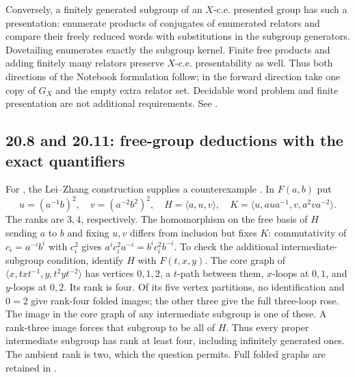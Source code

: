 Conversely, a finitely generated subgroup of an \(X\)-c.e.
presented group has such a presentation: enumerate products
of conjugates of enumerated relators and compare their
freely reduced words with substitutions in the subgroup
generators. Dovetailing enumerates exactly the subgroup
kernel. Finite free products and adding finitely many
relators preserve \(X\)-c.e. presentability as well.
Thus both directions of the Notebook formulation follow;
in the forward direction take one copy of \(G_X\) and
the empty extra relator set. Decidable word problem and
finite presentation are not additional requirements.
See .

\subsection{20.8 and 20.11: free-group deductions with the exact quantifiers}

\label{prior:20.8}
For , the Lei--Zhang construction supplies a
counterexample \cite{lei-zhang}. In \(F(a,b)\) put
\[
 u=(a^{-1}b)^2,\quad v=(a^{-2}b^2)^2,\quad
 H=\langle a,u,v\rangle,\quad
 K=\langle u,aua^{-1},v,a^2va^{-2}\rangle.
\]
The ranks are \(3,4\), respectively. The homomorphism
on the free basis of \(H\) sending \(a\) to \(b\) and
fixing \(u,v\) differs from inclusion but fixes \(K\):
commutativity of \(c_i=a^{-i}b^i\) with \(c_i^2\) gives
\(a^ic_i^2a^{-i}=b^ic_i^2b^{-i}\).
To check the additional intermediate-subgroup condition,
identify \(H\) with \(F(t,x,y)\). The core graph of
\(\langle x,txt^{-1},y,t^2yt^{-2}\rangle\) has vertices
\(0,1,2\), a \(t\)-path between them, \(x\)-loops at
\(0,1\), and \(y\)-loops at \(0,2\).
Its rank is four. Of its five vertex partitions, no
identification and \(0=2\) give rank-four folded images;
the other three give the full three-loop rose.
The image in the core graph of any intermediate subgroup
is one of these. A rank-three image forces that subgroup
to be all of \(H\). Thus every proper intermediate
subgroup has rank at least four, including infinitely
generated ones. The ambient rank is two, which the
question permits. Full folded graphs are retained in
.

